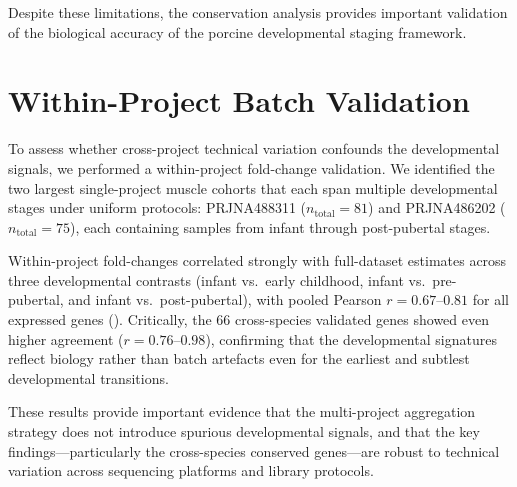 Despite these limitations, the conservation analysis provides important validation of the biological accuracy of the porcine developmental staging framework.


\section{Within-Project Batch Validation}\label{sec:results:batch}

To assess whether cross-project technical variation confounds the developmental signals, we performed a within-project fold-change validation. We identified the two largest single-project muscle cohorts that each span multiple developmental stages under uniform protocols: PRJNA488311 ($n_{\text{total}} = 81$) and PRJNA486202 ($n_{\text{total}} = 75$), each containing samples from infant through post-pubertal stages.

Within-project fold-changes correlated strongly with full-dataset estimates across three developmental contrasts (infant vs.\ early childhood, infant vs.\ pre-pubertal, and infant vs.\ post-pubertal), with pooled Pearson $r = 0.67$--$0.81$ for all expressed genes (). Critically, the 66 cross-species validated genes showed even higher agreement ($r = 0.76$--$0.98$), confirming that the developmental signatures reflect biology rather than batch artefacts even for the earliest and subtlest developmental transitions.

These results provide important evidence that the multi-project aggregation strategy does not introduce spurious developmental signals, and that the key findings---particularly the cross-species conserved genes---are robust to technical variation across sequencing platforms and library protocols.
